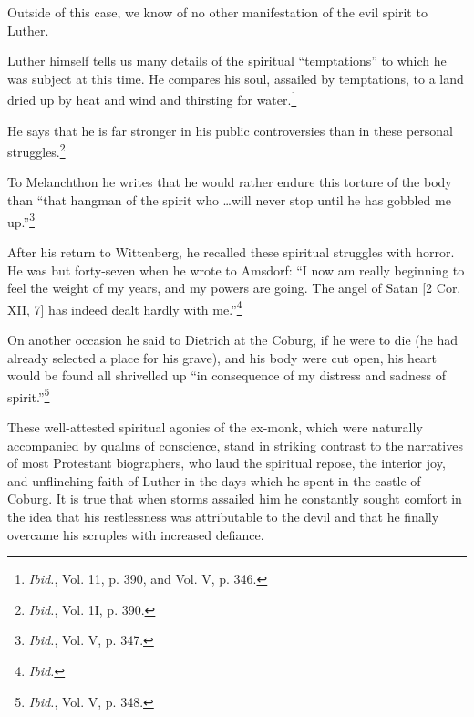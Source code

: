 Outside of this
case, we know of no other manifestation of the evil spirit to Luther.

Luther himself tells us many details of the spiritual “temptations”
to which he was subject at this time. He compares his soul, assailed
by temptations, to a land dried up by heat and wind and thirsting for
water.\footnote{\textit{Ibid.}, Vol. 11, p. 390, and Vol. V, p. 346.}

He says that he is far stronger in his public controversies than
in these personal struggles.\footnote{\textit{Ibid.}, Vol. 1I, p. 390.}

To Melanchthon he writes that he would
rather endure this torture of the body than “that hangman of the
spirit who \dots will never stop until he has gobbled me up.”\footnote{\textit{Ibid.}, Vol. V, p. 347.}

After
his return to Wittenberg, he recalled these spiritual struggles with
horror. He was but forty-seven when he wrote to Amsdorf: “I now
am really beginning to feel the weight of my years, and my powers
are going. The angel of Satan [2 Cor. XII, 7] has indeed dealt hardly
with me.”\footnote{\textit{Ibid.}}

On another occasion he said to Dietrich at the Coburg,
if he were to die (he had already selected a place for his grave),
and his body were cut open, his heart would be found all shrivelled
up “in consequence of my distress and sadness of spirit.”\footnote{\textit{Ibid.}, Vol. V, p. 348.}


These well-attested spiritual agonies of the ex-monk, which were
naturally accompanied by qualms of conscience, stand in striking
contrast to the narratives of most Protestant biographers, who laud
the spiritual repose, the interior joy, and unflinching faith of Luther
in the days which he spent in the castle of Coburg. It is true that when
storms assailed him he constantly sought comfort in the idea that his
restlessness was attributable to the devil and that he finally overcame
his scruples with increased defiance.

